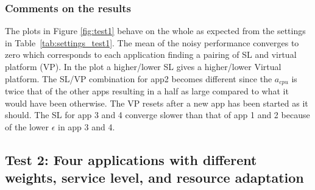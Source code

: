 \documentclass[nobiblatex]{LTHthesis}
\begin{document}
\subsubsection{Comments on the results}
The plots in Figure \ref{fig:test1} behave on the whole as expected from the settings in 
Table~\ref{tab:settings_test1}.
The mean of the noisy performance converges to zero which corresponds to each 
application finding a pairing of SL and virtual platform (VP). In the plot a 
higher/lower SL gives a higher/lower Virtual platform. The SL/VP combination
for app2 becomes different since the $a_{cpu}$ is twice that of the other apps 
resulting in a half as large compared to what it would have been otherwise. 
The VP resets after a new app has been started as it should. The SL for app 
3 and 4 converge slower than that of app 1 and 2 because of the lower
$\epsilon$ in app 3 and 4.

\subsection{Test 2: Four applications with different weights, 
  service level, and resource adaptation}
\end{document}
